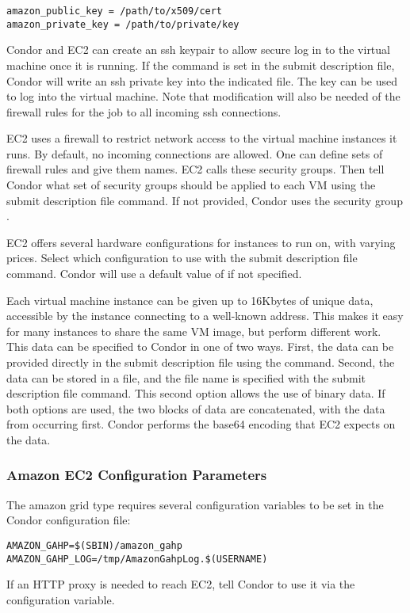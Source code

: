 \begin{verbatim}
amazon_public_key = /path/to/x509/cert
amazon_private_key = /path/to/private/key
\end{verbatim}

Condor and EC2 can create an ssh keypair to allow secure log in
to the virtual machine once it is running.
If the command
 is set in the submit description file,
Condor will write an ssh private key into the indicated file.
The key can be used to log into the virtual machine.
Note that modification will also be needed of the firewall
rules for the job to all incoming ssh connections.

EC2 uses a firewall to restrict network access to the virtual machine
instances it runs. By default, no incoming connections are allowed.
One can define sets of firewall rules and give them names.
EC2 calls these security groups. 
Then tell Condor what set of security
groups should be applied to each VM using the
 submit description file command.
If not provided, Condor uses the security group .

EC2 offers several hardware configurations for instances to run on, with
varying prices. 
Select which configuration to use with the
 submit description file command.
Condor will use a default value of
 if not specified.

Each virtual machine instance can be given up to 16Kbytes of unique data, 
accessible by the instance connecting to a well-known address.
This makes it easy for many instances to share the same VM image,
but perform different work.
This data can be specified to Condor in one of two ways.
First, the data can be provided directly in the submit description file 
using the  command.
Second, the data can be
stored in a file, and the file name is specified with the
 submit description file command.
This second option allows the use of binary data.
If both options are used, the two blocks of
data are concatenated, with the data from 
occurring first.
Condor performs the base64 encoding that EC2 expects on the data.

\subsubsection{\label{sec:Amazon-config}Amazon EC2 Configuration Parameters}

The amazon grid type requires several configuration variables 
to be set in the Condor configuration file:

\footnotesize
\begin{verbatim}
AMAZON_GAHP=$(SBIN)/amazon_gahp
AMAZON_GAHP_LOG=/tmp/AmazonGahpLog.$(USERNAME)
\end{verbatim}
\normalsize

If an HTTP proxy is needed to reach EC2, tell Condor to use it
via the  configuration variable.
